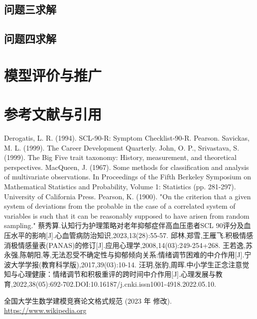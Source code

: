 \documentclass[withoutpreface,bwprint]{cumcmthesis} %
\begin{document}
\subsection{问题三求解}

\subsection{问题四求解}


\section{模型评价与推广}
\section{参考文献与引用}

\begin{thebibliography}{9}%
     Derogatis, L. R. (1994). SCL-90-R: Symptom Checklist-90-R. Pearson.
     Savickas, M. L. (1999). The Career Development Quarterly.
     John, O. P., Srivastava, S. (1999). The Big Five trait taxonomy: History, measurement, and theoretical perspectives.
    MacQueen, J. (1967). Some methods for classification and analysis of multivariate observations. In Proceedings of the Fifth Berkeley Symposium on Mathematical Statistics and Probability, Volume 1: Statistics (pp. 281-297). University of California Press.
    Pearson, K. (1900). "On the criterion that a given system of deviations from the probable in the case of a correlated system of variables is such that it can be reasonably supposed to have arisen from random sampling."
     蔡秀算.认知行为护理策略对老年抑郁症伴高血压患者SCL 90评分及血压水平的影响[J].心血管病防治知识,2023,13(28):55-57.
     邱林,郑雪,王雁飞.积极情感消极情感量表(PANAS)的修订[J].应用心理学,2008,14(03):249-254+268.
     王若逸,苏永强,陈朝阳,等,无法忍受不确定性与抑郁倾向关系:情绪调节困难的中介作用[J].宁波大学学报(教育科学版),2017,39(03):10-14.
     汪玥,张豹,周晖.中小学生正念注意觉知与心理健康：情绪调节和积极重评的跨时间中介作用[J].心理发展与教育,2022,38(05):692-702.DOI:10.16187/j.cnki.issn1001-4918.2022.05.10.

        全国大学生数学建模竞赛论文格式规范 (2023 年 修改).
     \url{https://www.wikipedia.org}
\end{thebibliography}
\end{document}
